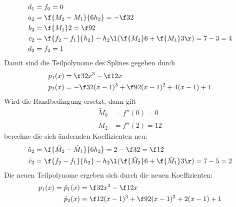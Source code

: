 \documentclass{mywork}
\begin{document}
\begin{aufgabe}
\begin{enumerate}[a)]
\begin{align*}
				d_1 &= f_0 = 0 \\
				a_2 &= \f {M_2-M_1}{6h_2} = -\f 32 \\
				b_2 &= \f {M_1}2 = \f 92 \\
				c_2 &= \f {f_2 - f_1}{h_2} - h_2\l(\f {M_2}6 + \f {M_1}3\r) = 7 - 3 = 4 \\
				d_2 &= f_2 = 1
			\end{align*}
			Damit sind die Teilpolynome des Splines gegeben durch
			\begin{align*}
				p_1(x) &= \f 32 x^3 - \f 12 x \\
				p_2(x) &= -\f 32 (x-1)^3 + \f 92 (x-1)^2 + 4(x-1) + 1
			\end{align*}
			Wird die Randbedingung ersetzt, dann gilt
			\begin{align*}
				\tilde M_0 &= f''(0) = 0 \\
				\tilde M_2 &= f''(2) = 12
			\end{align*}
			berechne die sich ändernden Koeffizienten neu:
			\begin{align*}
				\tilde a_2 &= \f {\tilde M_2-\tilde M_1}{6h_2} = 2 - \f 32 =  \f 12 \\
				\tilde c_2 &= \f {f_2 - f_1}{h_2} - h_2\l(\f {\tilde M_2}6 + \f {\tilde M_1}3\r) = 7 - 5 = 2 \\
			\end{align*}
			Die neuen Teilpolynome ergeben sich durch die neuen Koeffizienten:
			\begin{align*}
				p_1(x) = \tilde p_1(x) &= \f 32 x^3 - \f 12 x \\
				\tilde p_2(x) &= \f 12 (x-1)^3 + \f 92 (x-1)^2 + 2(x-1) + 1
			\end{align*}
	\end{enumerate}
\end{aufgabe}
\end{document}

